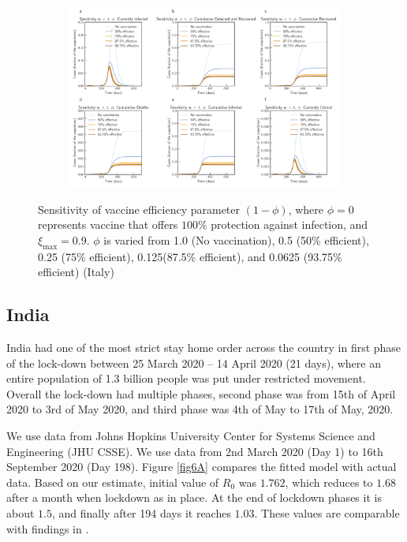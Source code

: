 \documentclass[fleqn,10pt]{wlscirep}
\begin{document}
\begin{figure}[t!]
	\centering
	\begin{subfigure}[b]{\textwidth}
		\centering
		\includegraphics[width=1\linewidth]{Italy_scenario_vaccination0.8.pdf}
	\end{subfigure}
	\caption{Sensitivity of vaccine efficiency parameter $(1-\phi)$, where $\phi = 0$ represents vaccine that offers $100\%$ protection against infection, and $\xi_{\max} = 0.9$. $\phi$ is varied from 1.0 (No vaccination), 0.5 (50\% efficient), 0.25 (75\% efficient), 0.125(87.5\% efficient), and 0.0625 (93.75\% efficient) (Italy)}
	\label{fig5B} 
\end{figure}
%
\subsection*{India}
India had one of the most strict stay home order across the country in first phase of the lock-down between 25 March 2020 – 14 April 2020 (21 days), where an entire population of 1.3 billion people was put under restricted movement. Overall the lock-down had multiple phases, second phase was from 15th of April 2020 to 3rd of May 2020, and third phase was 4th of May to 17th of May, 2020.

We use data from Johns Hopkins University Center for Systems Science and Engineering (JHU CSSE). We use data from 2nd March 2020 (Day 1) to 16th September 2020 (Day 198). Figure \ref{fig6A} compares the fitted model with actual data. Based on our estimate, initial value of $R_0$ was $1.762$, which reduces to $1.68$ after a month when lockdown as in place. At the end of lockdown phases it is about $1.5$, and finally after 194 days it reaches $1.03$. These values are comparable with findings in \cite{Chhabra2020.07.10.20150631,MARIMUTHU2020}.
\end{document}
